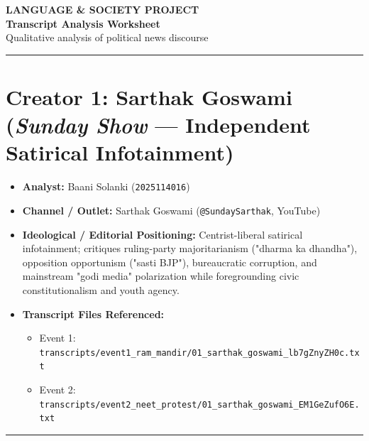 \documentclass[10pt,a4paper]{article}
\begin{document}
\begin{center}
    {\large\bfseries LANGUAGE \& SOCIETY PROJECT}\\[3pt]
    {\LARGE\bfseries Transcript Analysis Worksheet}\\[3pt]
    {\normalsize Qualitative analysis of political news discourse}
\end{center}
\vspace{2pt}
\noindent\rule{\textwidth}{0.4pt}
\vspace{4pt}


\section*{Creator 1: Sarthak Goswami (\textit{Sunday Show} --- Independent Satirical Infotainment)}
\begin{itemize}[leftmargin=1.5em, itemsep=3pt, topsep=4pt]
  \item \textbf{Analyst:} Baani Solanki (\texttt{2025114016})
  \item \textbf{Channel / Outlet:} Sarthak Goswami (\texttt{@SundaySarthak}, YouTube)
  \item \textbf{Ideological / Editorial Positioning:} Centrist-liberal satirical infotainment; critiques ruling-party majoritarianism ("dharma ka dhandha"), opposition opportunism ("sasti BJP"), bureaucratic corruption, and mainstream "godi media" polarization while foregrounding civic constitutionalism and youth agency.
  \item \textbf{Transcript Files Referenced:}
  \begin{itemize}[leftmargin=1.4em, itemsep=2pt, topsep=2pt]
    \item Event 1: \texttt{transcripts/event1\_ram\_mandir/01\_sarthak\_goswami\_lb7gZnyZH0c.txt}
    \item Event 2: \texttt{transcripts/event2\_neet\_protest/01\_sarthak\_goswami\_EM1GeZufO6E.txt}
  \end{itemize}
\end{itemize}
\vspace{4pt}\noindent\rule{\textwidth}{0.4pt}\vspace{4pt}
\end{document}

